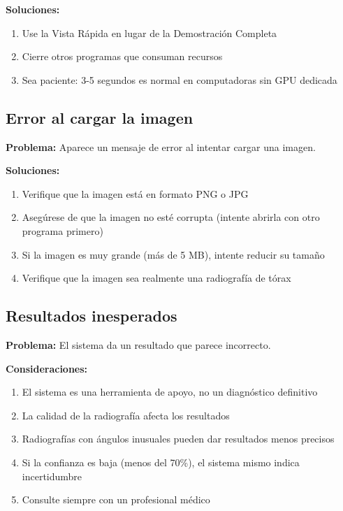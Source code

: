\documentclass[12pt,a4paper]{article}
\begin{document}
\textbf{Soluciones:}
\begin{enumerate}[leftmargin=*]
    \item Use la Vista Rápida en lugar de la Demostración Completa
    \item Cierre otros programas que consuman recursos
    \item Sea paciente: 3-5 segundos es normal en computadoras sin GPU dedicada
\end{enumerate}

\subsection{Error al cargar la imagen}

\textbf{Problema:} Aparece un mensaje de error al intentar cargar una imagen.

\textbf{Soluciones:}
\begin{enumerate}[leftmargin=*]
    \item Verifique que la imagen está en formato PNG o JPG
    \item Asegúrese de que la imagen no esté corrupta (intente abrirla con otro programa primero)
    \item Si la imagen es muy grande (más de 5 MB), intente reducir su tamaño
    \item Verifique que la imagen sea realmente una radiografía de tórax
\end{enumerate}

\subsection{Resultados inesperados}

\textbf{Problema:} El sistema da un resultado que parece incorrecto.

\textbf{Consideraciones:}
\begin{enumerate}[leftmargin=*]
    \item El sistema es una herramienta de apoyo, no un diagnóstico definitivo
    \item La calidad de la radiografía afecta los resultados
    \item Radiografías con ángulos inusuales pueden dar resultados menos precisos
    \item Si la confianza es baja (menos del 70\%), el sistema mismo indica incertidumbre
    \item Consulte siempre con un profesional médico
\end{enumerate}
\end{document}
